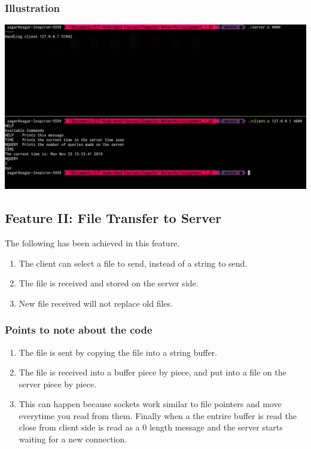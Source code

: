 \documentclass[a4paper,12pt]{report}
\begin{document}
\subsubsection{Illustration}
\begin{center}
\includegraphics[scale=0.25]{a1q1f1.png}
\end{center}
\subsection{Feature II: File Transfer to Server}
The following has been achieved in this feature.
\begin{enumerate}
\item The client can select a file to send, instead of a string to send.
\item The file is received and stored on the server side.
\item New file received will not replace old files.
\end{enumerate}
\subsubsection{Points to note about the code}
\begin{enumerate}
\item The file is sent by copying the file into a string buffer.
\item The file is received into a buffer piece by piece, and put into a file on the server piece by piece.
\item This can happen because sockets work similar to file pointers and move everytime you read from them. Finally when a the entrire buffer is read the close from client side is read as a 0 length message and the server starts waiting for a new connection.
\end{enumerate}
\end{document}
